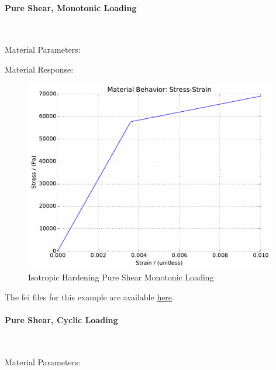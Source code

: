\documentclass[fleqn,11pt]{article}
\begin{document}
\paragraph{Pure Shear, Monotonic Loading} ~

Material Parameters:


Material Response:
\begin{figure}[H]
\begin{center}
\includegraphics[width=11cm]{../fei_examples/elastoplastic_isotropic_hardening/1pure_shear_mono_loading/result.pdf}
\caption{
\label{Isotropic Hardening Pure Shear Monotonic Loadin}
Isotropic Hardening Pure Shear Monotonic Loading}
\end{center}
\end{figure}

The fei files for this example are available \href{https://github.com/yuan-energy/education_examples/tree/master/fei_examples/isotropic_hardening_pure_shear/1pure_shear_mono_loading}{here}.

\newpage
\paragraph{Pure Shear, Cyclic Loading} ~

Material Parameters:

\end{document}
